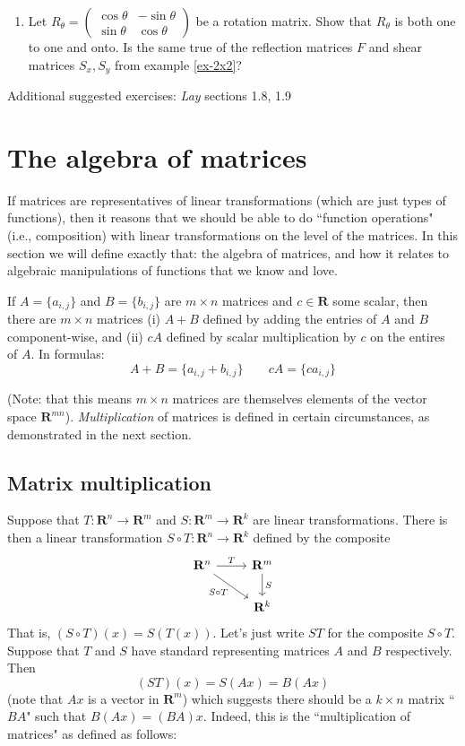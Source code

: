 \documentclass[12pt]{article}
\numberwithin{equation}{subsection}
\numberwithin{figure}{subsection}
\theoremstyle{note}
\begin{document}
\begin{enumerate}[label=\arabic*.]
	\item Let $R_{\theta}=\begin{pmatrix} \cos\theta & -\sin\theta \\ \sin \theta & \cos \theta\end{pmatrix}$ be a rotation matrix. Show that $R_{\theta}$ is both one to one and onto. Is the same true of the reflection matrices $F$ and shear matrices $S_x,S_y$ from example \ref{ex-2x2}?
\end{enumerate}

Additional suggested exercises: \textit{Lay} sections 1.8, 1.9



\section{The algebra of matrices}
If matrices are representatives of linear transformations (which are just types of functions), then it reasons that we should be able to do ``function operations" (i.e., composition) with linear transformations on the level of the matrices. In this section we will define exactly that: the algebra of matrices, and how it relates to algebraic manipulations of functions that we know and love. 

If $A=\{a_{i,j}\}$ and $B=\{b_{i,j}\}$ are $m\times n$ matrices and $c\in \mathbf{R}$ some scalar, then there are $m\times n$ matrices (i) $A+B$ defined by adding the entries of $A$ and $B$ component-wise, and (ii) $cA$ defined by scalar multiplication by $c$ on the entires of $A$. In formulas:  \begin{equation} A+B=\{a_{i,j}+b_{i,j}\} \qquad cA=\{ca_{i,j}\} \label{eq-add-mat} \end{equation}

(Note: that this means $m\times n$ matrices are themselves elements of the vector space $\mathbf{R}^{mn}$). \textit{Multiplication} of matrices is defined in certain circumstances, as demonstrated in the next section.

\subsection{Matrix multiplication}
Suppose that $T\colon \mathbf{R}^n\to\mathbf{R}^m$ and $S\colon \mathbf{R}^m\to\mathbf{R}^k$ are linear transformations. There is then a linear transformation $S\circ T\colon \mathbf{R}^n\to \mathbf{R}^k$ defined by the composite \[ \begin{tikzcd} \mathbf{R}^n \arrow{r}{T} \arrow{rd}[swap]{S\circ T} & \mathbf{R}^m \arrow{d}{S} \\ & \mathbf{R}^k \end{tikzcd}\]
That is, $(S\circ T)(x)=S(T(x))$. Let's just write $ST$ for the composite $S\circ T$. Suppose that $T$ and $S$ have standard representing matrices $A$ and $B$ respectively. Then \[ (ST)(x)=S(Ax)=B(Ax)\] (note that $Ax$ is a vector in $\mathbf{R}^m$) which suggests there should be a $k\times n$ matrix ``$BA$" such that $B(Ax)=(BA)x$. Indeed, this is the ``multiplication of matrices" as defined as follows:
\end{document}
